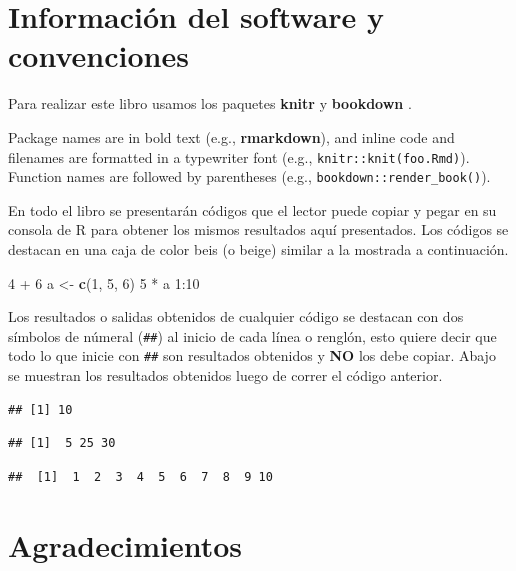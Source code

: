 \documentclass[10pt,]{krantz}
\makeatletter
\newenvironment{Shaded}{\begin{snugshade}}{\end{snugshade}}
\newcommand{\KeywordTok}[1]{\textcolor[rgb]{0.13,0.29,0.53}{\textbf{{#1}}}}
\newcommand{\DecValTok}[1]{\textcolor[rgb]{0.00,0.00,0.81}{{#1}}}
\newcommand{\StringTok}[1]{\textcolor[rgb]{0.31,0.60,0.02}{{#1}}}
\newcommand{\NormalTok}[1]{{#1}}
\let\proglang=\textsf
\newenvironment{kframe}{%
\medskip{}
\setlength{\fboxsep}{.8em}
 \def\at@end@of@kframe{}%
 \ifinner\ifhmode%
  \def\at@end@of@kframe{\end{minipage}}%
  \begin{minipage}{\columnwidth}%
 \fi\fi%
 \def\FrameCommand##1{\hskip\@totalleftmargin \hskip-\fboxsep
 \colorbox{shadecolor}{##1}\hskip-\fboxsep
     \hskip-\linewidth \hskip-\@totalleftmargin \hskip\columnwidth}%
 \MakeFramed {\advance\hsize-\width
   \@totalleftmargin\z@ \linewidth\hsize
   \@setminipage}}%
 {\par\unskip\endMakeFramed%
 \at@end@of@kframe}
\renewenvironment{Shaded}{\begin{kframe}}{\end{kframe}}
\makeatother
\begin{document}
\section*{Información del software y
convenciones}\label{informacion-del-software-y-convenciones}


Para realizar este libro usamos los paquetes \textbf{knitr}
\citep{xie2015} y \textbf{bookdown} \citep{R-bookdown}.

Package names are in bold text (e.g., \textbf{rmarkdown}), and inline
code and filenames are formatted in a typewriter font (e.g.,
\texttt{knitr::knit(\textquotesingle{}foo.Rmd\textquotesingle{})}).
Function names are followed by parentheses (e.g.,
\texttt{bookdown::render\_book()}).

En todo el libro se presentarán códigos que el lector puede copiar y
pegar en su consola de \proglang{R} para obtener los mismos resultados
aquí presentados. Los códigos se destacan en una caja de color beis (o
beige) similar a la mostrada a continuación.

\begin{Shaded}
\begin{Highlighting}[]
\DecValTok{4} \NormalTok{+}\StringTok{ }\DecValTok{6}
\NormalTok{a <-}\StringTok{ }\KeywordTok{c}\NormalTok{(}\DecValTok{1}\NormalTok{, }\DecValTok{5}\NormalTok{, }\DecValTok{6}\NormalTok{)}
\DecValTok{5} \NormalTok{*}\StringTok{ }\NormalTok{a}
\DecValTok{1}\NormalTok{:}\DecValTok{10}
\end{Highlighting}
\end{Shaded}

Los resultados o salidas obtenidos de cualquier código se destacan con
dos símbolos de númeral (\texttt{\#\#}) al inicio de cada línea o
renglón, esto quiere decir que todo lo que inicie con \texttt{\#\#} son
resultados obtenidos y \textbf{NO} los debe copiar. Abajo se muestran
los resultados obtenidos luego de correr el código anterior.

\begin{verbatim}
## [1] 10
\end{verbatim}

\begin{verbatim}
## [1]  5 25 30
\end{verbatim}

\begin{verbatim}
##  [1]  1  2  3  4  5  6  7  8  9 10
\end{verbatim}

\section*{Agradecimientos}\label{agradecimientos}
\end{document}
